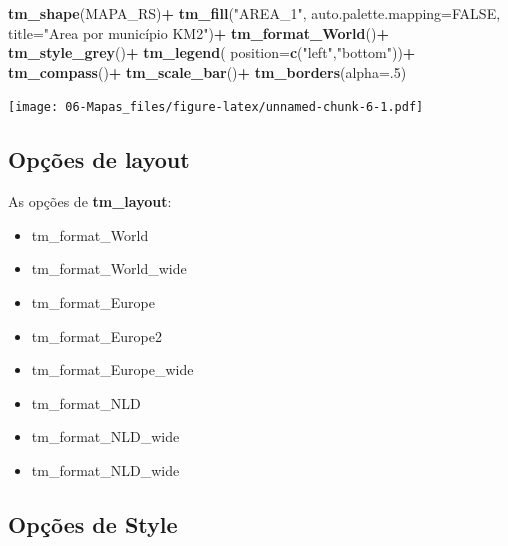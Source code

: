 \documentclass[12pt,brazil,]{book}
\newenvironment{Shaded}{\begin{snugshade}}{\end{snugshade}}
\newcommand{\DataTypeTok}[1]{\textcolor[rgb]{0.13,0.29,0.53}{#1}}
\newcommand{\DecValTok}[1]{\textcolor[rgb]{0.00,0.00,0.81}{#1}}
\newcommand{\KeywordTok}[1]{\textcolor[rgb]{0.13,0.29,0.53}{\textbf{#1}}}
\newcommand{\NormalTok}[1]{#1}
\newcommand{\OperatorTok}[1]{\textcolor[rgb]{0.81,0.36,0.00}{\textbf{#1}}}
\newcommand{\OtherTok}[1]{\textcolor[rgb]{0.56,0.35,0.01}{#1}}
\newcommand{\StringTok}[1]{\textcolor[rgb]{0.31,0.60,0.02}{#1}}
\providecommand{\tightlist}{%
  \setlength{\itemsep}{0pt}\setlength{\parskip}{0pt}}
\begin{document}
\begin{Shaded}
\begin{Highlighting}[]
   \KeywordTok{tm_shape}\NormalTok{(MAPA_RS)}\OperatorTok{+}
\StringTok{      }\KeywordTok{tm_fill}\NormalTok{(}\StringTok{"AREA_1"}\NormalTok{, }\DataTypeTok{auto.palette.mapping=}\OtherTok{FALSE}\NormalTok{, }\DataTypeTok{title=}\StringTok{"Area por município KM2"}\NormalTok{)}\OperatorTok{+}
\StringTok{      }\KeywordTok{tm_format_World}\NormalTok{()}\OperatorTok{+}
\StringTok{      }\KeywordTok{tm_style_grey}\NormalTok{()}\OperatorTok{+}
\StringTok{      }\KeywordTok{tm_legend}\NormalTok{(}
        \DataTypeTok{position=}\KeywordTok{c}\NormalTok{(}\StringTok{"left"}\NormalTok{,}\StringTok{"bottom"}\NormalTok{))}\OperatorTok{+}
\StringTok{      }\KeywordTok{tm_compass}\NormalTok{()}\OperatorTok{+}
\StringTok{      }\KeywordTok{tm_scale_bar}\NormalTok{()}\OperatorTok{+}
\StringTok{      }\KeywordTok{tm_borders}\NormalTok{(}\DataTypeTok{alpha=}\NormalTok{.}\DecValTok{5}\NormalTok{)}
\end{Highlighting}
\end{Shaded}

\texttt{[image: 06-Mapas\_files/figure-latex/unnamed-chunk-6-1.pdf]}

\hypertarget{opcoes-de-layout}{%
\subsection{Opções de layout}\label{opcoes-de-layout}}

As opções de \textbf{tm\_layout}:

\begin{itemize}
\tightlist
\item
  tm\_format\_World
\item
  tm\_format\_World\_wide\\
\item
  tm\_format\_Europe
\item
  tm\_format\_Europe2
\item
  tm\_format\_Europe\_wide
\item
  tm\_format\_NLD
\item
  tm\_format\_NLD\_wide
\item
  tm\_format\_NLD\_wide
\end{itemize}

\hypertarget{opcoes-de-style}{%
\subsection{Opções de Style}\label{opcoes-de-style}}
\end{document}
